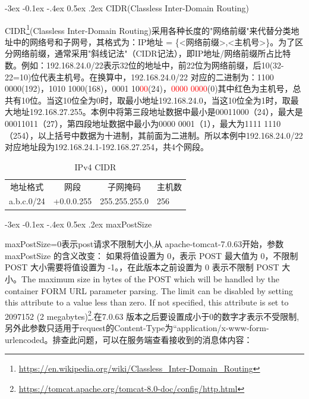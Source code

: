 \documentclass[8pt]{book}
\makeatletter
\numberwithin{dummy}{section}
\theoremstyle{ocrenumbox}
\theoremstyle{blacknumex}
\theoremstyle{blacknumbox}
\theoremstyle{ocrenum}
\renewcommand{\subsection}{\@startsection {subsection}{2}{\z@}
	{-3ex \@plus -0.1ex \@minus -.4ex}
	{0.5ex \@plus.2ex }
	{\normalfont\sffamily\bfseries}}
\makeatother
\begin{document}
\subsection{CIDR(Classless Inter-Domain Routing)}

CIDR\footnote{\url{https://en.wikipedia.org/wiki/Classless_Inter-Domain_Routing}}(Classless Inter-Domain Routing)采用各种长度的"网络前缀"来代替分类地址中的网络号和子网号，其格式为：IP地址 = \{<网络前缀>,<主机号>\}。为了区分网络前缀，通常采用"斜线记法"（CIDR记法），即IP地址/网络前缀所占比特数。例如：192.168.24.0/22表示32位的地址中，前22位为网络前缀，后10(32-22=10)位代表主机号。在换算中，192.168.24.0/22 对应的二进制为：1100 0000(192)，1010 1000(168)，0001 10\textcolor{red}{00}(24)，\textcolor{red}{0000 0000}(0)其中红色为主机号，总共有10位。当这10位全为0时，取最小地址192.168.24.0，当这10位全为1时，取最大地址192.168.27.255。本例中将第三段地址数据中最小是00011000（24），最大是00011011（27），第四段地址数据中最小为0000 0001（1），最大为1111 1110（254），以上括号中数据为十进制，其前面为二进制。所以本例中192.168.24.0/22 对应地址段为192.168.24.1-192.168.27.254，共4个网段。


\begin{table}[htbp]
	\caption{IPv4 CIDR}
	\label{table:ipv4cidr}
	\begin{center}
		\begin{tabular}{|c|c|c|p{3cm}|}
			\hline
			\multirow{1}{*}{地址格式}
			& \multicolumn{1}{c|}{网段}
			& \multicolumn{1}{c|}{子网掩码} 
			& \multicolumn{1}{c|}{主机数}\\			
			\cline{1-4}
			a.b.c.0/24 & +0.0.0.255 &  255.255.255.0  & 256 \\
			\hline							
		\end{tabular}	
	\end{center}
\end{table}

\subsection{maxPostSize}

maxPostSize=0表示post请求不限制大小,从 apache-tomcat-7.0.63开始，参数 maxPostSize 的含义改变： 如果将值设置为 0，表示 POST 最大值为 0，不限制 POST 大小需要将值设置为 -1。，在此版本之前设置为 0 表示不限制 POST 大小。The maximum size in bytes of the POST which will be handled by the container FORM URL parameter parsing. The limit can be disabled by setting this attribute to a value less than zero. If not specified, this attribute is set to 2097152 (2 megabytes)\footnote{\url{https://tomcat.apache.org/tomcat-8.0-doc/config/http.html}}.在7.0.63 版本之后要设置成小于0的数字才表示不受限制,另外此参数只适用于request的Content-Type为“application/x-www-form-urlencoded。排查此问题，可以在服务端查看接收到的消息体内容：
\end{document}

